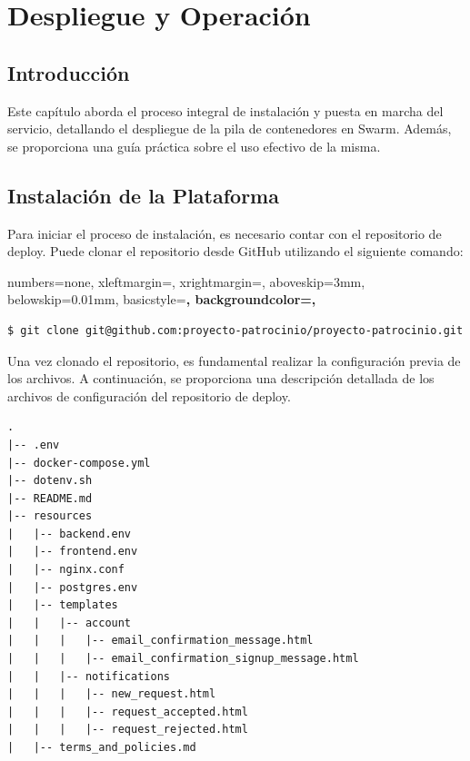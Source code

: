 \chapter{Despliegue y Operación}\label{cap:sum}

\section{Introducción}
Este capítulo aborda el proceso integral de instalación y puesta en marcha del servicio, detallando el despliegue de la pila de contenedores en Swarm. Además, se proporciona una guía práctica sobre el uso efectivo de la misma.


\section{Instalación de la Plataforma}

Para iniciar el proceso de instalación, es necesario contar con el repositorio de deploy. Puede clonar el repositorio desde GitHub utilizando el siguiente comando:


 {
    numbers=none,
    xleftmargin=\parindent,
    xrightmargin=\parindent,
    aboveskip=3mm,
    belowskip=0.01mm,
    basicstyle=\small\bf\ttfamily,
    backgroundcolor=\color{black!08},
}


\begin{lstlisting}[style=consola]
$ git clone git@github.com:proyecto-patrocinio/proyecto-patrocinio.git
\end{lstlisting}

Una vez clonado el repositorio, es fundamental realizar la configuración previa de los archivos.
 A continuación, se proporciona una descripción detallada de los archivos de configuración del repositorio de deploy. 


\begin{lstlisting}
.
|-- .env
|-- docker-compose.yml
|-- dotenv.sh
|-- README.md
|-- resources
|   |-- backend.env
|   |-- frontend.env
|   |-- nginx.conf
|   |-- postgres.env
|   |-- templates
|   |   |-- account
|   |   |   |-- email_confirmation_message.html
|   |   |   |-- email_confirmation_signup_message.html
|   |   |-- notifications
|   |   |   |-- new_request.html
|   |   |   |-- request_accepted.html
|   |   |   |-- request_rejected.html
|   |-- terms_and_policies.md
\end{lstlisting}




